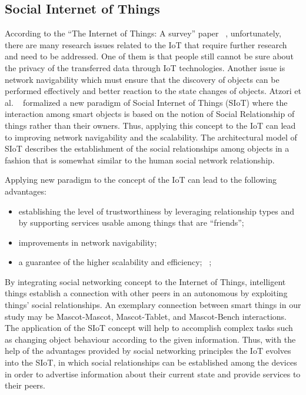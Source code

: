 \subsection{Social Internet of Things}
\label{sec:Social Internet of Things}
According to the “The Internet of Things: A survey” paper ~\cite{atzori2010internet}, unfortunately, there are many research issues related to the IoT that require further research and need to be addressed. One of them is that people still cannot be sure about the privacy of the transferred data through IoT technologies. Another issue is network navigability which must ensure that the discovery of objects can be performed effectively and better reaction to the state changes of objects. Atzori et al. ~\cite{atzori2011siot} formalized a new paradigm of Social Internet of Things (SIoT) where the interaction among smart objects is based on the notion of Social Relationship of things rather than their owners. Thus, applying this concept to the IoT can lead to improving network navigability and the scalability. The architectural model of SIoT describes the establishment of the social relationships among objects in a fashion that is somewhat similar to the human social network relationship. 
\par Applying new paradigm to the concept of the IoT can lead to the following advantages: 
\begin{itemize}
  \item establishing the level of trustworthiness by leveraging relationship types and by supporting services usable among things that are “friends”; 
  \item improvements in network navigability; 
  \item a guarantee of the higher scalability and efficiency; ~\cite{atzori2012social};
\end{itemize}
\par By integrating social networking concept to the Internet of Things, intelligent things establish a connection with other peers in an autonomous by exploiting things' social relationships. An exemplary connection between smart things in our study may be Mascot-Mascot, Mascot-Tablet, and Mascot-Bench interactions. The application of the SIoT concept will help to accomplish complex tasks such as changing object behaviour according to the given information. Thus, with the help of the advantages provided by social networking principles the IoT evolves into the SIoT, in which social relationships can be established among the devices in order to advertise information about their current state and provide services to their peers.

